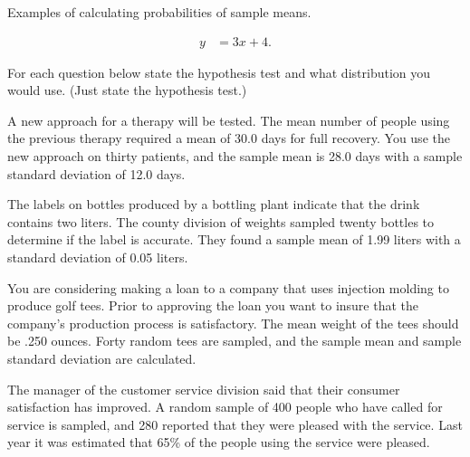 

\begin{problem}
\item Examples of calculating probabilities of sample means.

  \begin{subproblem}
  \item 
    \begin{eqnarray}
      y & = 3x + 4.
    \end{eqnarray}
    \vfill
  \end{subproblem}


\end{problem}



\begin{problem}

\item For each question below state the hypothesis test and what
  distribution you would use. (Just state the hypothesis test.)

  \begin{subproblem}
  \item A new approach for a therapy will be tested. The mean number
    of people using the previous therapy required a mean of 30.0 days
    for full recovery. You use the new approach on thirty patients,
    and the sample mean is 28.0 days with a sample standard deviation
    of 12.0 days.

    \vfill

  \item The labels on bottles produced by a bottling plant indicate that
    the drink contains two liters. The county division of weights
    sampled twenty bottles to determine if the label is accurate. They
    found a sample mean of 1.99 liters with a standard deviation of
    0.05 liters.

    \vfill

  \item You are considering making a loan to a company that uses
    injection molding to produce golf tees. Prior to approving the
    loan you want to insure that the company's production process is
    satisfactory. The mean weight of the tees should be .250
    ounces. Forty random tees are sampled, and the sample mean and
    sample standard deviation are calculated. 

    \vfill

  \item The manager of the customer service division said that their
    consumer satisfaction has improved. A random sample of 400 people
    who have called for service is sampled, and 280 reported that they
    were pleased with the service. Last year it was estimated that
    65\% of the people using the service were pleased. 


\end{subproblem}
\end{problem}

